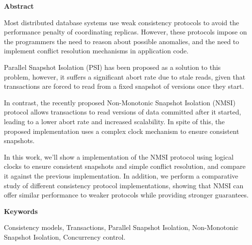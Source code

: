 \newpage

\begin{center}
{\bf \Huge Abstract}
\end{center}

\vspace{1cm}


Most distributed database systems use weak consistency protocols to avoid the
performance penalty of coordinating replicas. However, these protocols impose
on the programmers the need to reason about possible anomalies, and the need
to implement conflict resolution mechanisms in application code.

Parallel Snapshot Isolation (PSI) has been proposed as a solution to this
problem, however, it suffers a significant abort rate due to stale reads,
given that transactions are forced to read from a fixed snapshot of versions
once they start.

In contrast, the recently proposed Non-Monotonic Snapshot Isolation (NMSI)
protocol allows transactions to read versions of data committed after it
started, leading to a lower abort rate and increased scalability. In spite
of this, the proposed implementation uses a complex clock mechanism to ensure
consistent snapshots.

In this work, we'll show a implementation of the NMSI protocol using logical
clocks to ensure consistent snapshots and simple conflict resolution, and
compare it against the previous implementation. In addition, we perform a
comparative study of different consistency protocol implementations, showing
that NMSI can offer similar performance to weaker protocols while providing
stronger guarantees.

\vspace{1cm}

\begin{center}
{\bf \Large Keywords}
\end{center}

\vspace{0.5cm}

Consistency models, Transactions, Parallel Snapshot Isolation, Non-Monotonic Snapshot Isolation, Concurrency control.
